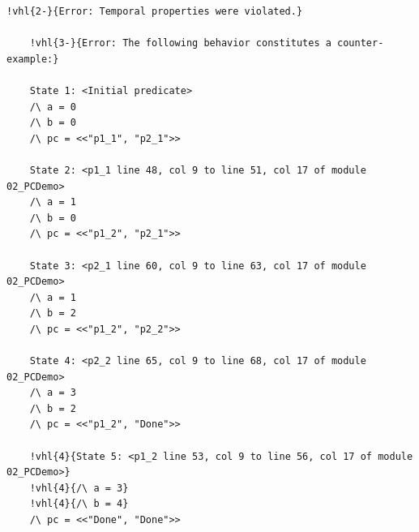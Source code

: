 \documentclass[
  11pt,aspectratio=1610,pdf,hyperref={unicode,colorlinks=false}
]{beamer}
\begin{document}
\newcommand{\vhl}[2]{\alt<#1>{\bf\ttfamily\textcolor{red!90!black}{#2}}{#2}}
\begin{frame}[c,fragile]
  \begin{tcolorbox}[colback=shellbgcolor,boxrule=.25pt]%
  \centering\tiny%
  \begin{Verbatim}[commandchars=!\{\}]
    !vhl{2-}{Error: Temporal properties were violated.}

    !vhl{3-}{Error: The following behavior constitutes a counter-example:}
    
    State 1: <Initial predicate>
    /\ a = 0
    /\ b = 0
    /\ pc = <<"p1_1", "p2_1">>
    
    State 2: <p1_1 line 48, col 9 to line 51, col 17 of module 02_PCDemo>
    /\ a = 1
    /\ b = 0
    /\ pc = <<"p1_2", "p2_1">>
    
    State 3: <p2_1 line 60, col 9 to line 63, col 17 of module 02_PCDemo>
    /\ a = 1
    /\ b = 2
    /\ pc = <<"p1_2", "p2_2">>
    
    State 4: <p2_2 line 65, col 9 to line 68, col 17 of module 02_PCDemo>
    /\ a = 3
    /\ b = 2
    /\ pc = <<"p1_2", "Done">>
    
    !vhl{4}{State 5: <p1_2 line 53, col 9 to line 56, col 17 of module 02_PCDemo>}
    !vhl{4}{/\ a = 3}
    !vhl{4}{/\ b = 4}
    /\ pc = <<"Done", "Done">>
  \end{Verbatim}
\end{tcolorbox}
\end{frame}

\begin{frame}[c]
  \centering{}%
\end{frame}
\end{document}
